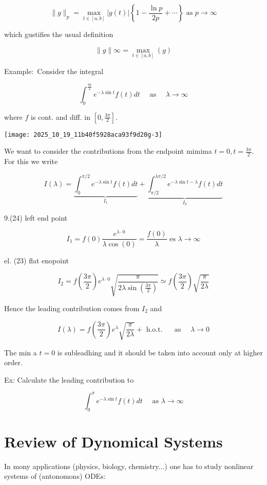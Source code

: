 $$ 
\|g\|_{p}=\max _{t \in[a, b]}|g(t)|\left\{1-\frac{\ln p}{2 p}+\cdots\right\} \text { as } p \rightarrow \infty 
$$ 

which gustifies the usual definition

$$ 
\|g\|\infty=\max _{t \in[a, b]}(g) 
$$ 

Example:\ Consider the integral

$$ 
\int_{0}^{\frac{3 \pi}{2}} e^{-\lambda \sin t} f(t) d t \quad \text { as } \quad \lambda \rightarrow \infty 
$$ 

where $f$ is cont. and diff. in $\left[0, \frac{3 \pi}{2}\right]$.
\begin{center}
\texttt{[image: 2025\_10\_19\_11b40f5928aca93f9d20g-3]}
\end{center}

We want to consider the contributions from the endpoint mimima $t=0, t=\frac{3 \pi}{2}$. For this we write

$$ 
I(\lambda)=\underbrace{\int_{0}^{\pi / 2} e^{-\lambda \sin t} f(t) d t}_{I_{1}}+\underbrace{\int_{\pi / 2}^{\lambda \pi / 2} e^{-\lambda \sin t-\lambda} f(t) d t}_{I_{2}} 
$$ 

9.(24) left end point

$$ 
I_{1}=f(0) \frac{e^{\lambda \cdot 0}}{\lambda \cos (0)}=\frac{f(0)}{\lambda} \text { es } \lambda \rightarrow \infty 
$$ 

el. (23) flat enopoint

$$ 
I_{2}=f\left(\frac{3 \pi}{2}\right) e^{\lambda \cdot 0} \sqrt{\frac{\pi}{2 \lambda \sin \left(\frac{3 \pi}{2}\right)}} \simeq f\left(\frac{3 \pi}{2}\right) \sqrt{\frac{\pi}{2 \lambda}} 
$$ 

Hence the leading contribution comes from $I_{2}$ and

$$ 
I(\lambda)=f\left(\frac{3 \pi}{2}\right) e^{\lambda} \sqrt{\frac{\pi}{2 \lambda}} +\text { h.o.t. } \quad \text { as } \quad \lambda \rightarrow 0 
$$ 

The min a $t=0$ is subleadhing and it should be taken into account only at higher order.

Ex: Calculate the leading contribution to

$$ 
\int_{0}^{\pi} e^{-\lambda \sin t} f(t) d t \quad \text { as } \lambda \rightarrow \infty 
$$ 

\section*{Review of Dynomical Systems}
In mony applications (physics, biology, chemistry...) one has to study nonlinear systems of (antonomons) ODEs:

